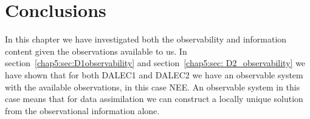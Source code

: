 


\section{Conclusions}

In this chapter we have investigated both the observability and information content given the observations available to us. In section~\ref{chap5:sec:D1observability} and section~\ref{chap5:sec: D2_observability} we have shown that for both DALEC1 and DALEC2 we have an observable system with the available observations, in this case NEE. An observable system in this case means that for data assimilation we can construct a locally unique solution from the observational information alone. 

